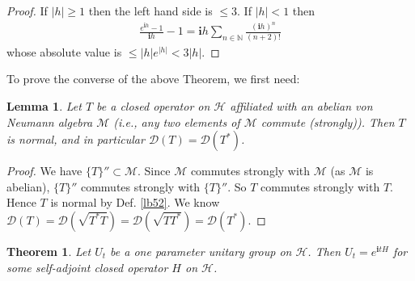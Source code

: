 \documentclass[12pt,a4paper,notitlepage]{article}
\theoremstyle{definition}
\theoremstyle{plain}
\newtheorem{thm}[df]{Theorem}
\newtheorem{lm}[df]{Lemma}
\newcommand{\mc}{\mathcal}
\newcommand{\Dom}{\scr D}
\newcommand{\scr}{\mathscr}
\newcommand{\im}{\mathbf{i}}
\newcommand{\Nbb}{\mathbb N}
\numberwithin{equation}{section}
\begin{document}
\begin{proof}
If $|h|\geq 1$ then the left hand side is $\leq 3$. If $|h|<1$ then
\begin{align*}
\frac{e^{\im h}-1}{\im h}-1=\im h\sum_{n\in\Nbb}\frac{(\im h)^n}{(n+2)!} 	
\end{align*}
whose absolute value is $\leq |h| e^{|h|}<3|h|$.
\end{proof}

To prove the converse of the above Theorem, we first need:

\begin{lm}\label{lb53}
Let $T$ be a closed operator on $\mc H$ affiliated with an abelian von Neumann algebra $\mc M$ (i.e., any two elements of $\mc M$ commute (strongly)). Then $T$ is normal, and in particular $\Dom(T)=\Dom(T^*)$.
\end{lm}

\begin{proof}
We have $\{T\}''\subset\mc M$. Since $\mc M$ commutes strongly with $\mc M$ (as $\mc M$ is abelian),  $\{T\}''$ commutes strongly with $\{T\}''$. So $T$ commutes strongly with $T$. Hence $T$ is normal by Def. \ref{lb52}. We know $\Dom(T)=\Dom(\sqrt{T^*T})=\Dom(\sqrt{TT^*})=\Dom(T^*)$.
\end{proof}




\begin{thm}\label{lb54}
Let $U_t$ be a one parameter unitary group on $\mc H$. Then $U_t=e^{\im tH}$ for some self-adjoint closed operator $H$ on $\mc H$.
\end{thm}
\end{document}
